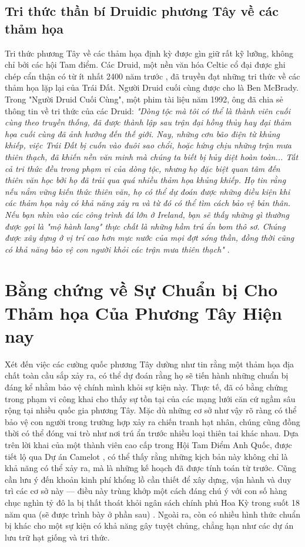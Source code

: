 \subsection{Tri thức thần bí Druidic phương Tây về các thảm họa}

Tri thức phương Tây về các thảm họa định kỳ được gìn giữ rất kỹ lưỡng, không chỉ bởi các hội Tam điểm. Các Druid, một nền văn hóa Celtic cổ đại được ghi chép cẩn thận có từ ít nhất 2400 năm trước \cite{7}, đã truyền đạt những tri thức về các thảm họa lặp lại của Trái Đất. Người Druid cuối cùng được cho là Ben McBrady. Trong "Người Druid Cuối Cùng", một phim tài liệu năm 1992, ông đã chia sẻ thông tin về tri thức của các Druid: \textit{"Dòng tộc mà tôi có thể là thành viên cuối cùng theo truyền thống, đã được thành lập sau trận đại hồng thủy hay đại thảm họa cuối cùng đã ảnh hưởng đến thế giới. Nay, những cơn bão điện từ khủng khiếp, việc Trái Đất bị cuốn vào đuôi sao chổi, hoặc hứng chịu những trận mưa thiên thạch, đã khiến nền văn minh mà chúng ta biết bị hủy diệt hoàn toàn... Tất cả tri thức đều trong phạm vi của dòng tộc, nhưng họ đặc biệt quan tâm đến thiên văn học bởi họ đã trải qua quá nhiều thảm họa khủng khiếp. Họ tin rằng nếu nắm vững kiến thức thiên văn, họ có thể dự đoán được những điều kiện khi các thảm họa này có khả năng xảy ra và từ đó có thể tìm cách bảo vệ bản thân. Nếu bạn nhìn vào các công trình đá lớn ở Ireland, bạn sẽ thấy những gì thường được gọi là "mộ hành lang" thực chất là những hầm trú ẩn bom thô sơ. Chúng được xây dựng ở vị trí cao hơn mực nước của mọi đợt sóng thần, đồng thời cũng có khả năng bảo vệ con người khỏi các trận mưa thiên thạch"} \cite{8,9}.

\section{Bằng chứng về Sự Chuẩn bị Cho Thảm họa Của Phương Tây Hiện nay}

Xét đến việc các cường quốc phương Tây dường như tin rằng một thảm họa địa chất toàn cầu sắp xảy ra, có thể dự đoán rằng họ sẽ tiến hành những chuẩn bị đáng kể nhằm bảo vệ chính mình khỏi sự kiện này. Thực tế, đã có bằng chứng trong phạm vi công khai cho thấy sự tồn tại của các mạng lưới căn cứ ngầm sâu rộng tại nhiều quốc gia phương Tây. Mặc dù những cơ sở như vậy rõ ràng có thể bảo vệ con người trong trường hợp xảy ra chiến tranh hạt nhân, chúng cũng đồng thời có thể đóng vai trò như nơi trú ẩn trước nhiều loại thiên tai khác nhau. Dựa trên lời khai của một thành viên cao cấp trong Hội Tam Điểm Anh Quốc, được tiết lộ qua Dự án Camelot \cite{4,6}, có thể thấy rằng những kịch bản này không chỉ là khả năng có thể xảy ra, mà là những kế hoạch đã được tính toán từ trước. Cũng cần lưu ý đến khoản kinh phí khổng lồ cần thiết để xây dựng, vận hành và duy trì các cơ sở này — điều này trùng khớp một cách đáng chú ý với con số hàng chục nghìn tỷ đô la bị thất thoát khỏi ngân sách chính phủ Hoa Kỳ trong suốt 18 năm qua (sẽ được trình bày ở phần sau) \cite{11,12,13}. Ngoài ra, còn có nhiều hình thức chuẩn bị khác cho một sự kiện có khả năng gây tuyệt chủng, chẳng hạn như các dự án lưu trữ hạt giống và tri thức.

